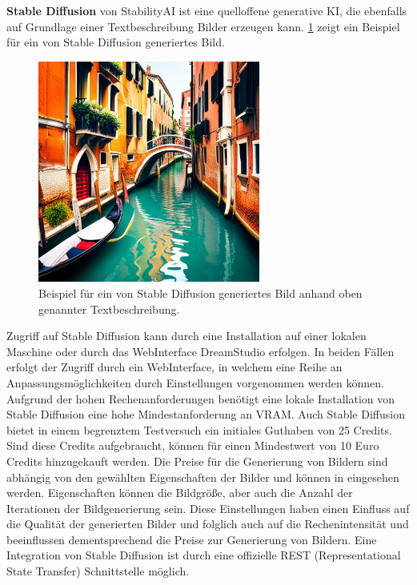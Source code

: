 \textbf{Stable Diffusion} von StabilityAI ist eine quelloffene generative KI, die ebenfalls auf Grundlage einer Textbeschreibung Bilder erzeugen kann.
\cref{sec2:sota:subsubsec:fz1:discussion:fig:venice-stable-diffusion} zeigt ein Beispiel für ein von Stable Diffusion generiertes Bild.
\begin{figure}[htb]
    \centering
    \includegraphics[width=0.65\textwidth, keepaspectratio]{chapter/chapter_2/venice-stable-diffusion.png}
    \caption{Beispiel für ein von Stable Diffusion generiertes Bild anhand oben genannter Textbeschreibung.}
    \label{sec2:sota:subsubsec:fz1:discussion:fig:venice-stable-diffusion}
\end{figure}
Zugriff auf Stable Diffusion kann durch eine Installation auf einer lokalen Maschine oder durch das WebInterface DreamStudio erfolgen.
In beiden Fällen erfolgt der Zugriff durch ein WebInterface, in welchem eine Reihe an Anpassungsmöglichkeiten durch Einstellungen vorgenommen werden können.
Aufgrund der hohen Rechenanforderungen benötigt eine lokale Installation von Stable Diffusion eine hohe Mindestanforderung an VRAM.
Auch Stable Diffusion bietet in einem begrenztem Testversuch ein initiales Guthaben von 25 Credits.
Sind diese Credits aufgebraucht, können für einen Mindestwert von 10 Euro Credits hinzugekauft werden.
Die Preise für die Generierung von Bildern sind abhängig von den gewählten Eigenschaften der Bilder und können in \cite{sd-pricing} eingesehen werden.
Eigenschaften können die Bildgröße, aber auch die Anzahl der Iterationen der Bildgenerierung sein.
Diese Einstellungen haben einen Einfluss auf die Qualität der generierten Bilder und folglich auch auf die Rechenintensität und beeinflussen dementsprechend die Preise zur Generierung von Bildern.
Eine Integration von Stable Diffusion ist durch eine offizielle REST (Representational State Transfer) \cite{rest} Schnittstelle möglich.


